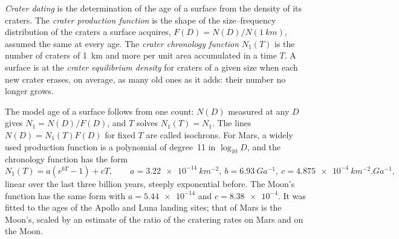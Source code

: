 \begin{definition}\label{def:b3:planetary-interiors-surfaces:crater-dating}
\emph{Crater dating} is the determination of the age
of a surface from the density of its craters. The \emph{crater production
function} is the shape of the
size--frequency distribution of the craters a surface acquires, $F(D) =
N(D)/N(\qty{1}{km})$, assumed the same at every age. The \emph{crater
chronology function} $N_1(T)$ is the
number of craters of \qty{1}{km} and more per unit area accumulated in a
time $T$. A surface is at the \emph{crater equilibrium
density} for craters of a given size
when each new crater erases, on average, as many old ones as it adds:
their number no longer grows.
\end{definition}

The model age of a surface follows from one count: $N(D)$ measured at any
$D$ gives $N_1 = N(D)/F(D)$, and $T$ solves $N_1(T) = N_1$. The lines
$N(D) = N_1(T)F(D)$ for fixed $T$ are called isochrons. For Mars, a widely
used production function is a polynomial of degree~11 in $\log_{10}D$, and
the chronology function has the form
\[
  N_1(T) = a\left(e^{bT} - 1\right) + cT , \qquad
  a = \qty{3.22e-14}{km^{-2}}, \ b = \qty{6.93}{Ga^{-1}}, \
  c = \qty{4.875e-4}{km^{-2}.Ga^{-1}} ,
\]
linear over the last three billion years, steeply exponential before. The
Moon's function has the same form with $a = \num{5.44e-14}$ and $c =
\num{8.38e-4}$. It was fitted to the ages of the Apollo and Luna landing
sites; that of Mars is the Moon's, scaled by an estimate of the ratio of
the cratering rates on Mars and on the Moon.

